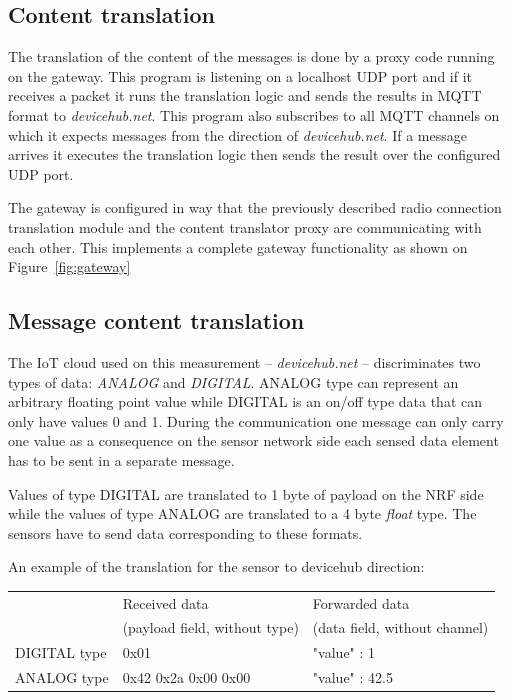 \documentclass[a4paper]{article}
\begin{document}
\subsection{Content translation}

The translation of the content of the messages is done by a proxy code running on the gateway.
This program is listening on a localhost UDP port and if it receives a packet it runs the
translation logic and sends the results in MQTT format to \emph{devicehub.net}. This program
also subscribes to all MQTT channels on which it expects messages from the direction of \emph{devicehub.net}.
If a message arrives it executes the translation logic then sends the result over the
configured UDP port.

The gateway is configured in way that the previously described radio connection translation
module and the content translator proxy are communicating with each other. This implements a complete
gateway functionality as shown on Figure~\ref{fig:gateway}

\subsection{Message content translation}

The IoT cloud used on this measurement -- \emph{devicehub.net} -- discriminates two types of
data: \emph{ANALOG} and \emph{DIGITAL}. ANALOG type can represent an arbitrary floating point
value while DIGITAL is an on/off type data that can only have values 0 and 1.
During the communication one message can only carry one value as a consequence on the sensor
network side each sensed data element has to be sent in a separate message.

Values of type DIGITAL are translated to 1 byte of payload on the NRF side while the values
of type ANALOG are translated to a 4 byte \emph{float} type. The sensors have to send data
corresponding to these formats.

An example of the translation for the sensor to devicehub direction:

\begin{tabular}{|l|l|l|}
    \hline
                 & Received data                 & Forwarded data                 \\
                 & (payload field, without type) & (data field, without channel)  \\
    \hline
    DIGITAL type & 0x01                          & {"value" : 1}                  \\
    \hline
    ANALOG type  & 0x42 0x2a 0x00 0x00           & {"value" : 42.5}               \\
    \hline
\end{tabular}
\end{document}
